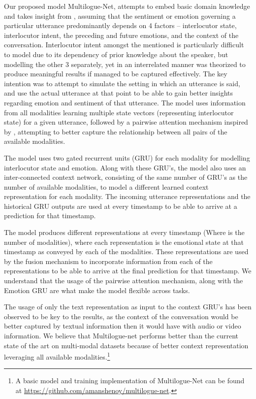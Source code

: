 \documentclass[11pt,a4paper]{article}
\begin{document}
Our proposed model Multilogue-Net, attempts to embed basic domain knowledge and takes insight from \citet{poria3}, assuming that the sentiment or emotion governing a particular utterance predominantly depends on 4 factors – 	interlocutor state, interlocutor intent, the preceding and future emotions, and the context of the conversation. Interlocutor intent amongst the mentioned is particularly difficult to model due to its dependency of prior knowledge about the speaker, but modelling the other 3 separately, yet in an interrelated manner was theorized to produce meaningful results if managed to be captured effectively. The key intention was to attempt to simulate the setting in which an utterance is said, and use the actual utterance at that point to be able to gain better insights regarding emotion and sentiment of that utterance. The model uses information from all modalities learning multiple state vectors (representing interlocutor state) for a given utterance, followed by a pairwise attention mechanism inspired by \citet{ghosal}, attempting to better capture the relationship between all pairs of the available modalities.	

The model uses two gated recurrent units (GRU) \cite{chung} for each modality for modelling interlocutor state and emotion. Along with these GRU's, the model also uses an inter-connected context network, consisting of the same number of GRU's as the number of available modalities, to model a different learned context representation for each modality. The incoming utterance representations and the historical GRU outputs are used at every timestamp to be able to arrive at a prediction for that timestamp. 

The model produces  different representations at every timestamp (Where  is the number of modalities), where each representation is the emotional state at that timestamp as conveyed by each of the modalities. These  representations are used by the fusion mechanism to incorporate information from each of the  representations to be able to arrive at the final prediction for that timestamp. We understand that the usage of the pairwise attention mechanism, along with the Emotion GRU are what make the model flexible across tasks.

The usage of only the text representation as input to the context GRU’s has been observed to be key to the results, as the context of the conversation would be better captured by textual information then it would have with audio or video information. We believe that Multilogue-net performs better than the current state of the art \cite{ghosal} on multi-modal datasets because of better context representation leveraging all available modalities.\footnote{A basic model and training implementation of Multilogue-Net can be found at \url{https://github.com/amanshenoy/multilogue-net}.}
\end{document}
